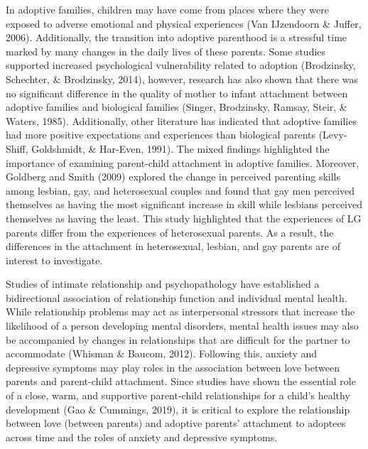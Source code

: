 \documentclass[man]{apa6}
\begin{document}
In adoptive families, children may have come from places where they were exposed to adverse emotional and physical experiences (Van IJzendoorn \& Juffer, 2006). Additionally, the transition into adoptive parenthood is a stressful time marked by many changes in the daily lives of these parents. Some studies supported increased psychological vulnerability related to adoption (Brodzinsky, Schechter, \& Brodzinsky, 2014), however, research has also shown that there was no significant difference in the quality of mother to infant attachment between adoptive families and biological families (Singer, Brodzinsky, Ramsay, Steir, \& Waters, 1985). Additionally, other literature has indicated that adoptive families had more positive expectations and experiences than biological parents (Levy-Shiff, Goldshmidt, \& Har-Even, 1991). The mixed findings highlighted the importance of examining parent-child attachment in adoptive families. Moreover, Goldberg and Smith (2009) explored the change in perceived parenting skills among lesbian, gay, and heterosexual couples and found that gay men perceived themselves as having the most significant increase in skill while lesbians perceived themselves as having the least. This study highlighted that the experiences of LG parents differ from the experiences of heterosexual parents. As a result, the differences in the attachment in heterosexual, lesbian, and gay parents are of interest to investigate.

Studies of intimate relationship and psychopathology have established a bidirectional association of relationship function and individual mental health. While relationship problems may act as interpersonal stressors that increase the likelihood of a person developing mental disorders, mental health issues may also be accompanied by changes in relationships that are difficult for the partner to accommodate (Whisman \& Baucom, 2012). Following this, anxiety and depressive symptoms may play roles in the association between love between parents and parent-child attachment. Since studies have shown the essential role of a close, warm, and supportive parent-child relationships for a child's healthy development (Gao \& Cummings, 2019), it is critical to explore the relationship between love (between parents) and adoptive parents' attachment to adoptees across time and the roles of anxiety and depressive symptoms.
\end{document}
